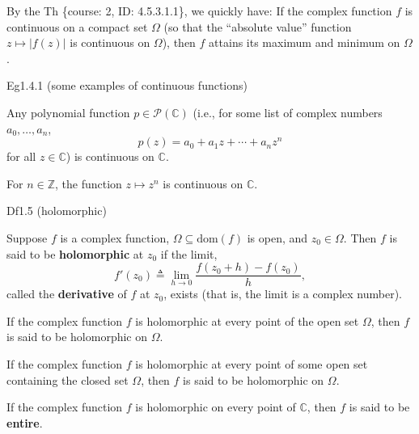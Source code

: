 \documentclass{article}
\begin{document}
\begin{Rmk}{}
    By the Th \{course: 2, ID: 4.5.3.1.1\}, we quickly have:
    \textcolor{Th}{If the complex function $f$ is continuous on a compact set $\varOmega$ (so that the ``absolute value'' function $z\mapsto |f(z)|$ is continuous on $\varOmega$), then $f$ attains its maximum and minimum on $\varOmega$.}
\end{Rmk}

\begin{Th}{Eg1.4.1 (some examples of continuous functions)}
    \begin{compactenum}
        \item Any polynomial function $p\in\mathcal{P}(\mathbb{C})$ (i.e., for some list of complex numbers $a_0, \dots, a_n$,
        $$ p(z) = a_0 + a_1z + \cdots + a_nz^n $$
        for all $z\in\mathbb{C}$) is continuous on $\mathbb{C}$.
        \item For $n\in\mathbb{Z}$, the function $z\mapsto z^n$ is continuous on $\mathbb{C}$.
    \end{compactenum}
\end{Th}

\begin{Df}{Df1.5 (holomorphic)}
    \begin{compactenum}
        \item Suppose $f$ is a complex function, $\varOmega\subseteq\text{dom}(f)$ is open, and $z_0\in\varOmega$. Then $f$ is said to be \textbf{holomorphic} at $z_0$ if the limit, 
        $$ f'(z_0) \triangleq \lim_{h\to 0} \frac{f(z_0+h)-f(z_0)}{h}, $$
        called the \textbf{derivative} of $f$ at $z_0$, exists (that is, the limit is a complex number).
        \item If the complex function $f$ is holomorphic at every point of the open set $\varOmega$, then $f$ is said to be holomorphic on $\varOmega$.
        \item If the complex function $f$ is holomorphic at every point of some open set containing the closed set $\varOmega$, then $f$ is said to be holomorphic on $\varOmega$.
        \item If the complex function $f$ is holomorphic on every point of $\mathbb{C}$, then $f$ is said to be \textbf{entire}.
    \end{compactenum}
\end{Df}
\end{document}
